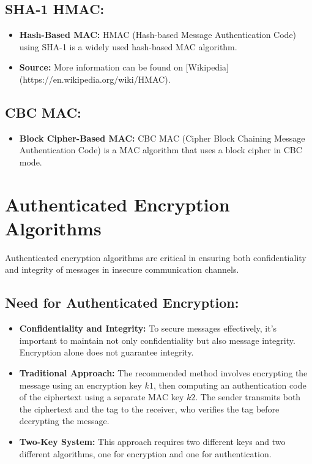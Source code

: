 \documentclass[12pt]{article}
\begin{document}
\subsection*{SHA-1 HMAC:}
\begin{itemize}
    \item \textbf{Hash-Based MAC:} HMAC (Hash-based Message Authentication Code) using SHA-1 is a widely used hash-based MAC algorithm.
    \item \textbf{Source:} More information can be found on [Wikipedia](https://en.wikipedia.org/wiki/HMAC).
\end{itemize}

\subsection*{CBC MAC:}
\begin{itemize}
    \item \textbf{Block Cipher-Based MAC:} CBC MAC (Cipher Block Chaining Message Authentication Code) is a MAC algorithm that uses a block cipher in CBC mode.
\end{itemize}

\section*{Authenticated Encryption Algorithms}

Authenticated encryption algorithms are critical in ensuring both confidentiality and integrity of messages in insecure communication channels.

\subsection*{Need for Authenticated Encryption:}
\begin{itemize}
    \item \textbf{Confidentiality and Integrity:} To secure messages effectively, it's important to maintain not only confidentiality but also message integrity. Encryption alone does not guarantee integrity.
    \item \textbf{Traditional Approach:} The recommended method involves encrypting the message using an encryption key \( k1 \), then computing an authentication code of the ciphertext using a separate MAC key \( k2 \). The sender transmits both the ciphertext and the tag to the receiver, who verifies the tag before decrypting the message.
    \item \textbf{Two-Key System:} This approach requires two different keys and two different algorithms, one for encryption and one for authentication.
\end{itemize}
\end{document}
